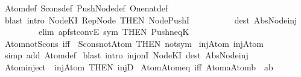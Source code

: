 \begin{isabellebody}
%
\isadelimproof
%
\endisadelimproof
%
\isatagproof
{}\isamarkupfalse%
\ Atom{\isacharunderscore}def\ Scons{\isacharunderscore}def\ Push{\isacharunderscore}Node{\isacharunderscore}def\ One{\isacharunderscore}nat{\isacharunderscore}def\isanewline
{}\isamarkupfalse%
\ {\isacharparenleft}blast\ intro{\isacharcolon}\ Node{\isacharunderscore}K{}{\isacharunderscore}I\ Rep{\isacharunderscore}Node\ {\isacharbrackleft}THEN\ Node{\isacharunderscore}Push{\isacharunderscore}I{\isacharbrackright}\ \isanewline
\ \ \ \ \ \ \ \ \ dest{\isacharbang}{\isacharcolon}\ Abs{\isacharunderscore}Node{\isacharunderscore}inj\ \isanewline
\ \ \ \ \ \ \ \ \ elim{\isacharbang}{\isacharcolon}\ apfst{\isacharunderscore}convE\ sym\ {\isacharbrackleft}THEN\ Push{\isacharunderscore}neq{\isacharunderscore}K{}{\isacharbrackright}{\isacharparenright}%
\endisatagproof
{\isafoldproof}%
%
\isadelimproof
\ \ \isanewline
%
\endisadelimproof
\isanewline
{}\isamarkupfalse%
\ Atom{\isacharunderscore}not{\isacharunderscore}Scons\ {\isacharbrackleft}iff{\isacharbrackright}\ {\isacharequal}\ Scons{\isacharunderscore}not{\isacharunderscore}Atom\ {\isacharbrackleft}THEN\ not{\isacharunderscore}sym{\isacharbrackright}\isanewline
\isanewline
\isanewline
\isanewline
\isanewline
\isanewline
\isanewline
{}\isamarkupfalse%
\ inj{\isacharunderscore}Atom{\isacharcolon}\ {\isachardoublequoteopen}inj{\isacharparenleft}Atom{\isacharparenright}{\isachardoublequoteclose}\isanewline
%
\isadelimproof
%
\endisadelimproof
%
\isatagproof
{}\isamarkupfalse%
\ {\isacharparenleft}simp\ add{\isacharcolon}\ Atom{\isacharunderscore}def{\isacharparenright}\isanewline
{}\isamarkupfalse%
\ {\isacharparenleft}blast\ intro{\isacharbang}{\isacharcolon}\ inj{\isacharunderscore}onI\ Node{\isacharunderscore}K{}{\isacharunderscore}I\ dest{\isacharbang}{\isacharcolon}\ Abs{\isacharunderscore}Node{\isacharunderscore}inj{\isacharparenright}\isanewline
{}\isamarkupfalse%
%
\endisatagproof
{\isafoldproof}%
%
\isadelimproof
\isanewline
%
\endisadelimproof
{}\isamarkupfalse%
\ Atom{\isacharunderscore}inject\ {\isacharequal}\ inj{\isacharunderscore}Atom\ {\isacharbrackleft}THEN\ injD{\isacharbrackright}\isanewline
\isanewline
{}\isamarkupfalse%
\ Atom{\isacharunderscore}Atom{\isacharunderscore}eq\ {\isacharbrackleft}iff{\isacharbrackright}{\isacharcolon}\ {\isachardoublequoteopen}{\isacharparenleft}Atom{\isacharparenleft}a{\isacharparenright}{\isacharequal}Atom{\isacharparenleft}b{\isacharparenright}{\isacharparenright}\ {\isacharequal}\ {\isacharparenleft}a{\isacharequal}b{\isacharparenright}{\isachardoublequoteclose}\isanewline

\end{isabellebody}
